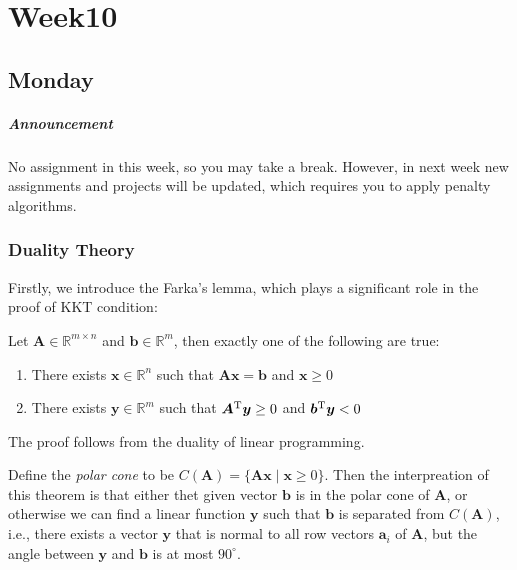 
\chapter{Week10}
\section{Monday}
\paragraph{Announcement}
No assignment in this week, so you may take a break. However, in next week new assignments and projects will be updated, which requires you to apply penalty algorithms.
\subsection{Duality Theory}
Firstly, we introduce the Farka's lemma, which plays a significant role in the proof of KKT condition:
\begin{theorem}
Let $\bm A\in\mathbb{R}^{m\times n}$ and $\bm b\in\mathbb{R}^m$, then exactly one of the following are true:
\begin{enumerate}
\item
There exists $\bm x\in\mathbb{R}^n$ such that $\bm{Ax}=\bm b$ and $\bm x\ge0$
\item
There exists $\bm y\in\mathbb{R}^m$ such that $\bm A^{\mathrm T}\bm y\ge0$ and $\bm b^{\mathrm T}\bm y<0$
\end{enumerate}
\end{theorem}
The proof follows from the duality of linear programming.
\begin{remark}
Define the \emph{polar cone} to be $C(\bm A)=\{\bm{Ax}\mid \bm x\ge0\}$. Then the interpreation of this theorem is that either thet given vector $\bm b$ is in the polar cone of $\bm A$, or otherwise we can find a linear function $\bm y$ such that $\bm b$ is separated from $C(\bm A)$, i.e., there exists a vector $\bm y$ that is normal to all row vectors $\bm a_i$ of $\bm A$, but the angle between $\bm y$ and $\bm b$ is at most $90^{\circ}$.
\end{remark}

